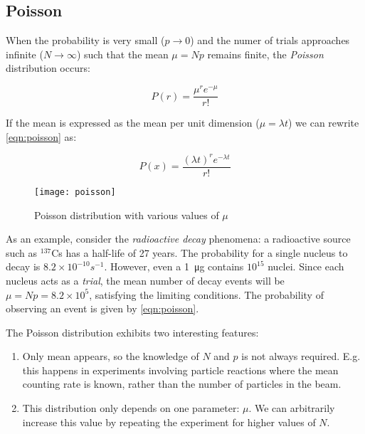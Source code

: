 \subsection{Poisson}

When the probability is very small ($p \rightarrow 0$) and the numer of trials approaches infinite ($N \rightarrow \infty$) such that the mean $\mu = N p$ remains finite, the \textit{Poisson} distribution occurs:


\begin{equation}
	\label{eqn:poisson}
	P\left( r \right) = \frac{{\mu^{ r } e ^{-\mu} }}{{r!}}
\end{equation}

If the mean is expressed as the mean per unit dimension ($\mu = \lambda t$) we can rewrite \ref{eqn:poisson} as:

\begin{equation}
	P\left( x \right) = \frac{(\lambda t) ^r {e^{ - \lambda t}} }{{r!}}
\end{equation}

\begin{figure}
	\centerline{
		\texttt{[image: poisson]}}
	\caption{Poisson distribution with various values of $\mu$ \cite{leo2012techniques}}
\end{figure}

As an example, consider the \textit{radioactive decay} phenomena: a radioactive source such as $^{137}$Cs has a half-life of 27 years. The probability for a single nucleus to decay is $8.2 \times 10^{-10}s^{-1}$. However, even a \SI{1}{\micro\gram} contains $10^{15}$ nuclei. Since each nucleus acts as a \textit{trial}, the mean number of decay events will be $\mu = N p = 8.2 \times 10^5$, satisfying the limiting conditions. The probability of observing an event is given by \ref{eqn:poisson}.

The Poisson distribution exhibits two interesting features:

\begin{enumerate}
	\item Only mean appears, so the knowledge of $N$ and $p$ is not always required. E.g. this happens in experiments involving particle reactions where the mean counting rate is known, rather than the number of particles in the beam.

	\item This distribution only depends on one parameter: $\mu$. We can arbitrarily increase this value by repeating the experiment for higher values of $N$.
\end{enumerate}

